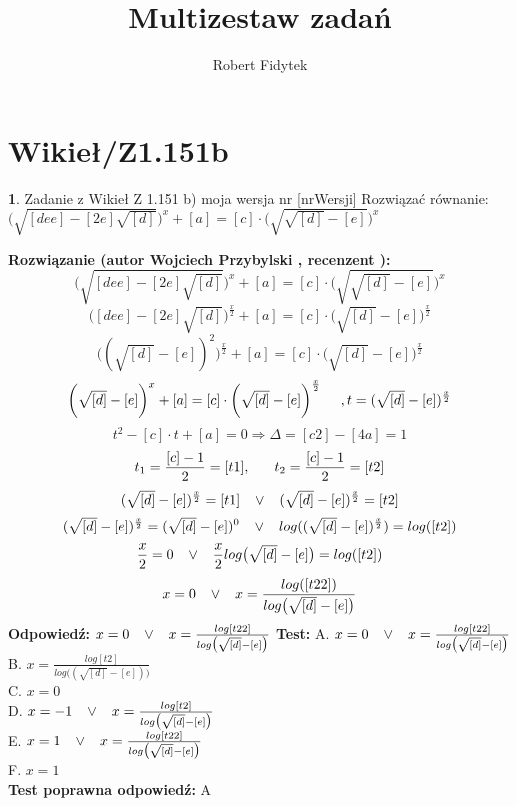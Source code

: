 \documentclass[12pt, a4paper]{article}
\title{Multizestaw zadań}
\author{Robert Fidytek}
\date{}
\theoremstyle{definition} %
\newtheorem{zad}{}
\newcommand{\kategoria}[1]{\section{#1}} %
\newcommand{\zadStart}[1]{\begin{zad}#1\newline} %
\newcommand{\zadStop}{\end{zad}}   %
\newcommand{\rozwStart}[2]{\noindent \textbf{Rozwiązanie (autor #1 , recenzent #2): }\newline} %
\newcommand{\rozwStop}{\newline}                                            %
\newcommand{\odpStart}{\noindent \textbf{Odpowiedź:}\newline}    %
\newcommand{\odpStop}{\newline}                                             %
\newcommand{\testStart}{\noindent \textbf{Test:}\newline} %
\newcommand{\testStop}{\newline} %
\newcommand{\kluczStart}{\noindent \textbf{Test poprawna odpowiedź:}\newline} %
\newcommand{\kluczStop}{\newline} %
\begin{document}
\maketitle


\kategoria{Wikieł/Z1.151b}
\zadStart{Zadanie z Wikieł Z 1.151 b) moja wersja nr [nrWersji]}
Rozwiązać równanie: $\bigg(\sqrt{[dee]-[2e]\sqrt{[d]}}\bigg)^{x}+[a]=[c]\cdot\bigg(\sqrt{\sqrt{[d]}-[e]}\bigg)^{x}$
\zadStop
\rozwStart{Wojciech Przybylski}{}
$$\bigg(\sqrt{[dee]-[2e]\sqrt{[d]}}\bigg)^{x}+[a]=[c]\cdot\bigg(\sqrt{\sqrt{[d]}-[e]}\bigg)^{x}$$
$$\bigg([dee]-[2e]\sqrt{[d]}\bigg)^{\frac{x}{2}}+[a]=[c]\cdot\bigg(\sqrt{[d]}-[e]\bigg)^{\frac{x}{2}}$$
$$\bigg((\sqrt{[d]}-[e])^{2}\bigg)^{\frac{x}{2}}+[a]=[c]\cdot\bigg(\sqrt{[d]}-[e]\bigg)^{\frac{x}{2}}$$
$$\bigg(\sqrt{[d]}-[e]\bigg)^{x}+[a]=[c]\cdot\bigg(\sqrt{[d]}-[e]\bigg)^{\frac{x}{2}}\hspace{5mm}, t=(\sqrt{[d]}-[e])^{\frac{x}{2}}$$
$$t^{2}-[c]\cdot t+[a]=0 \Rightarrow \Delta=[c2]-[4a]=1$$
$$t_{1}=\frac{[c]-1}{2}=[t1], \hspace{6mm} t_{2}=\frac{[c]-1}{2}=[t2]$$
$$(\sqrt{[d]}-[e])^{\frac{x}{2}}=[t1]  \hspace{3mm} \vee  \hspace{3mm}(\sqrt{[d]}-[e])^{\frac{x}{2}}=[t2]$$
$$(\sqrt{[d]}-[e])^{\frac{x}{2}}=(\sqrt{[d]}-[e])^{0}  \hspace{3mm} \vee  \hspace{3mm} log((\sqrt{[d]}-[e])^{\frac{x}{2}})=log([t2])$$
$$\frac{x}{2}=0  \hspace{3mm} \vee  \hspace{3mm} \frac{x}{2}log\big(\sqrt{[d]}-[e]\big)=log([t2])$$
$$x=0  \hspace{3mm} \vee  \hspace{3mm} x=\frac{log([t22])}{log\big(\sqrt{[d]}-[e]\big)}$$
\rozwStop
\odpStart
$x=0  \hspace{3mm} \vee  \hspace{3mm} x=\frac{log[t22]}{log\big(\sqrt{[d]}-[e]\big)}$
\odpStop
\testStart
A. $x=0  \hspace{3mm} \vee  \hspace{3mm} x=\frac{log[t22]}{log\big(\sqrt{[d]}-[e]\big)}$\\
B. $x=\frac{log[t2]}{log\big((\sqrt{[d]}-[e])\big)}$\\
C. $x=0$\\
D. $x=-1  \hspace{3mm} \vee  \hspace{3mm} x=\frac{log[t2]}{log\big(\sqrt{[d]}-[e]\big)}$\\
E. $x=1  \hspace{3mm} \vee  \hspace{3mm} x=\frac{log[t22]}{log\big(\sqrt{[d]}-[e]\big)}$\\
F. $x=1$\\
\testStop
\kluczStart
A
\kluczStop
\end{document}
